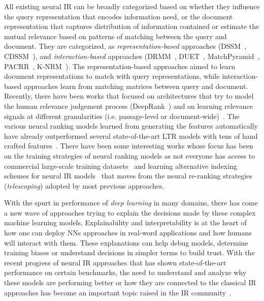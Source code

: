All existing neural IR can be broadly categorized based on whether they influence the query representation that encodes information need, or the document representation that captures distribution of information contained or estimate the mutual relevance based on patterns of matching between the query and document. They are categorized, as \textit{representation-based} approaches (DSSM~\citep{dssm13}, CDSSM~\citep{Shen2014a, Shen2014b}), and \textit{interaction-based} approaches (DRMM~\citep{Guo2016}, DUET~\citep{Mitra2017a}, MatchPyramid~\citep{matchpyramid16}, PACRR~\citep{pacrr17, co_pacrr_wsdm18}, K-NRM~\citep{KNRM17}). The representation-based approaches aimed to learn document representations to match with query representations, while interaction-based approaches learn from matching matrices between query and document. Recently, there have been works that focused on architectures that try to model the human relevance judgement process (DeepRank~\citep{Pang_deeprank_2017}) and on learning relevance signals at different granularities (i.e. passage-level or document-wide)~\citep{Fan_hint_2018}. The various neural ranking models learned from generating the features automatically have already outperformed several state-of-the-art LTR models with tens of hand crafted features~\citep{Pang_deeprank_2017, Fan_hint_2018}. There have been some interesting works whose focus has been on the training strategies of neural ranking models as not everyone has access to commercial large-scale training datasets~\citep{Dehghani_sigir17, dehghani2018fidelityweighted} and learning alternative indexing schemes for neural IR models~\citep{Zamani_neural_reranking_2018} that moves from the neural re-ranking strategies (\textit{telescoping}) adopted by most previous approaches.

With the spurt in performance of \textit{deep learning} in many domains, there has come a new wave of approaches trying to explain the decisions made by these complex machine learning models. Explainability and interpretability is at the heart of how one can  deploy NNs approaches in real-word applications and how humans will interact with them. These explanations can help debug models, determine training biases or understand decisions in simpler terms to build trust. With the recent progress of neural IR approaches that has shown state-of-the-art performance on certain benchmarks, the need to understand and analyze why these models are performing better or how they are connected to the classical IR approaches has become an important topic raised in the IR community~\citep{craswell2017sigir, Craswell2018sigir_forum}.

